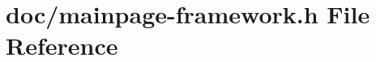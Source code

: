 \hypertarget{mainpage-framework_8h}{}\section{doc/mainpage-\/framework.h File Reference}
\label{mainpage-framework_8h}
